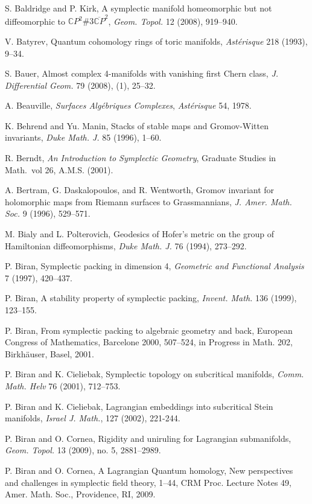  S. Baldridge and P. Kirk, A symplectic manifold homeomorphic but not diffeomorphic to $\mathbb{C}P^{2}\#3\overline{\mathbb{C}P}^{2}$, \emph{Geom. Topol.} 12 (2008), 919–940.

 V. Batyrev, Quantum cohomology rings of toric manifolds, \emph{Astérisque} 218 (1993), 9–34.

 S. Bauer, Almost complex 4-manifolds with vanishing first Chern class, \emph{J. Differential Geom.} 79 (2008), (1), 25–32.

 A. Beauville, \emph{Surfaces Algébriques Complexes}, \emph{Astérisque} 54, 1978.

 K. Behrend and Yu. Manin, Stacks of stable maps and Gromov-Witten invariants, \emph{Duke Math. J.} 85 (1996), 1–60.

 R. Berndt, \emph{An Introduction to Symplectic Geometry}, Graduate Studies in Math.\ vol 26, A.M.S. (2001).

 A. Bertram, G. Daskalopoulos, and R. Wentworth, Gromov invariant for holomorphic maps from Riemann surfaces to Grassmannians, \emph{J. Amer. Math. Soc.} 9 (1996), 529–571.

 M. Bialy and L. Polterovich, Geodesics of Hofer’s metric on the group of Hamiltonian diffeomorphisms, \emph{Duke Math. J.} 76 (1994), 273–292.

 P. Biran, Symplectic packing in dimension 4, \emph{Geometric and Functional Analysis} 7 (1997), 420–437.

 P. Biran, A stability property of symplectic packing, \emph{Invent. Math.} 136 (1999), 123–155.

 P. Biran, From symplectic packing to algebraic geometry and back, European Congress of Mathematics, Barcelone 2000, 507–524, in Progress in Math. 202, Birkhäuser, Basel, 2001.

 P. Biran and K. Cieliebak, Symplectic topology on subcritical manifolds, \emph{Comm. Math. Helv} 76 (2001), 712–753.

 P. Biran and K. Cieliebak, Lagrangian embeddings into subcritical Stein manifolds, \emph{Israel J. Math.}, 127 (2002), 221-244.

 P. Biran and O. Cornea, Rigidity and uniruling for Lagrangian submanifolds, \emph{Geom. Topol.} 13 (2009), no. 5, 2881–2989.

 P. Biran and O. Cornea, A Lagrangian Quantum homology, New perspectives and challenges in symplectic field theory, 1–44, CRM Proc. Lecture Notes 49, Amer. Math. Soc., Providence, RI, 2009.


